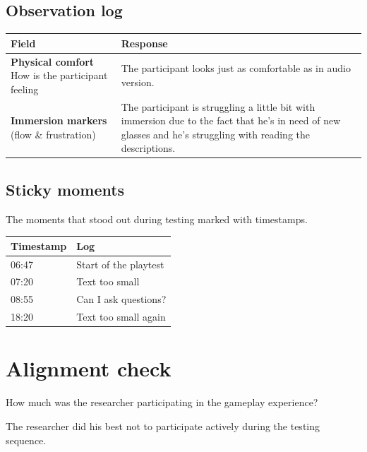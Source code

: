 \subsection{Observation log}
\begin{table}[h]
\centering
\begin{tabular}{|p{5cm}|p{10cm}|}
\hline
\textbf{Field} & \textbf{Response} \\ \hline
\textbf{Physical comfort} How is the participant feeling & The participant looks just as comfortable as in audio version.\\[1.5cm] \hline
\textbf{Immersion markers} (flow \& frustration) & The participant is struggling a little bit with immersion due to the fact that he's in need of new glasses and he's struggling with reading the descriptions.\\[1.5cm] \hline
\end{tabular}
\end{table}


\subsection{Sticky moments}
The moments that stood out during testing marked with timestamps.

\begin{table}[h]
\centering
\begin{tabular}{|p{3cm}|p{10cm}|}
\hline
\textbf{Timestamp} & \textbf{Log} \\ \hline
06:47 & Start of the playtest \\ \hline 
07:20 & Text too small \\ \hline 
08:55 & Can I ask questions? \\ \hline 
18:20 & Text too small again \\ \hline 
\end{tabular}
\end{table}

\section{Alignment check}
How much was the researcher participating in the gameplay experience? 

The researcher did his best not to participate actively during the testing sequence. 



